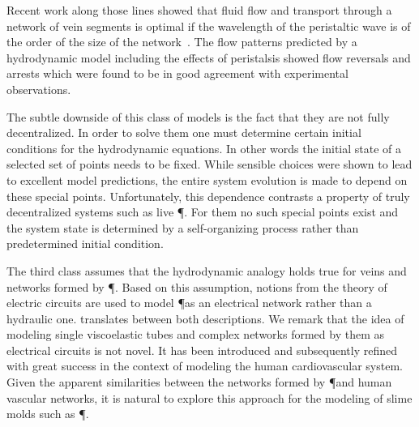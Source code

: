   Recent work along those lines showed that fluid flow and transport through a network of vein segments is optimal if the wavelength of the peristaltic wave is of the order of the size of the network~\cite{alim2013random}. The flow patterns predicted by a hydrodynamic model including the effects of peristalsis showed flow reversals and arrests which were found to be in good agreement with experimental observations. 

  The subtle downside of this class of models is the fact that they are not fully decentralized. In order to solve them one must determine certain initial conditions for the hydrodynamic equations. In other words the initial state of a selected set of points needs to be fixed. While sensible choices were shown to lead to excellent model predictions, the entire system evolution is made to depend on these special points. Unfortunately, this dependence contrasts a property of truly decentralized systems such as live \P. For them no such special points exist and the system state is determined by a self-organizing process rather than predetermined initial condition.

  The third class assumes that the hydrodynamic analogy holds true for veins and networks formed by \P. Based on this assumption, notions from the theory of electric circuits are used to model \P as an electrical network rather than a hydraulic one.  translates between both descriptions. We remark that the idea of modeling single viscoelastic tubes and complex networks formed by them as electrical circuits is not novel. It has been introduced and subsequently refined with great success in the context of modeling the human cardiovascular system\cite{frank1899grundform,stefanovska1999physics,hardung1962propagation,landes1943einige,dePater1964}. Given the apparent similarities between the networks formed by \P and human vascular networks, it is natural to explore this approach for the modeling of slime molds such as \P.

